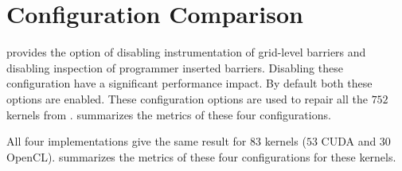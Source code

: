 \section{Configuration Comparison}

\tool provides the option of disabling instrumentation of grid-level barriers and disabling inspection of programmer inserted barriers. Disabling these configuration have a significant performance impact. By default both these options are enabled. These configuration options are used to repair all the $752$ kernels from .  summarizes the metrics of these four configurations.



All four implementations give the same result for $83$ kernels ($53$ CUDA and $30$ OpenCL).  summarizes the metrics of these four configurations for these kernels.


